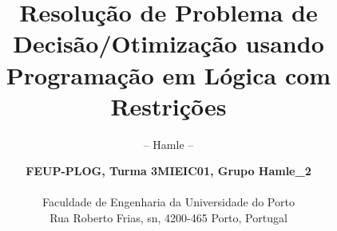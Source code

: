 \documentclass[envcountsame,envcountchap]{svmono}
\begin{document}
\author{\textbf{FEUP-PLOG, Turma 3MIEIC01, Grupo Hamle\_2}\\ \\
	\normalsize Faculdade de Engenharia da Universidade do Porto \\ 
	\small Rua Roberto Frias, s\/n, 4200-465 Porto, Portugal }

\title{Resolu\c{c}\~ao de Problema de Decis\~ao/Otimiza\c{c}\~ao usando
	Programa\c{c}\~ao em L\'ogica com Restri\c{c}\~oes}
\subtitle{-- Hamle --}


\maketitle



\frontmatter%


\let\cleardoublepage\clearpage
\tableofcontents

\mainmatter%







\appendix


\backmatter%
\printindex

\end{document}
